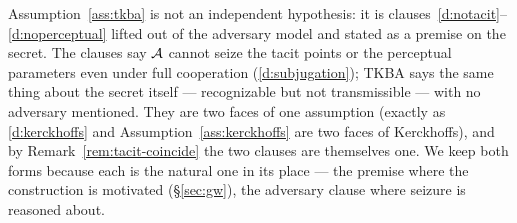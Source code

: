 \begin{remark}\label{rem:tkba-restates}
Assumption~\ref{ass:tkba} is not an independent hypothesis: it is
clauses~\ref{d:notacit}--\ref{d:noperceptual} lifted out of the adversary model and
stated as a premise on the secret. The clauses say $\mathcal{A}$ cannot seize the
tacit points or the perceptual parameters even under full cooperation
(\ref{d:subjugation}); TKBA says the same thing about the secret itself ---
recognizable but not transmissible --- with no adversary mentioned. They are two
faces of one assumption (exactly as \ref{d:kerckhoffs} and
Assumption~\ref{ass:kerckhoffs} are two faces of Kerckhoffs), and by
Remark~\ref{rem:tacit-coincide} the two clauses are themselves one. We keep both
forms because each is the natural one in its place --- the premise where the
construction is motivated (\S\ref{sec:gw}), the adversary clause where seizure is
reasoned about.
\end{remark}

